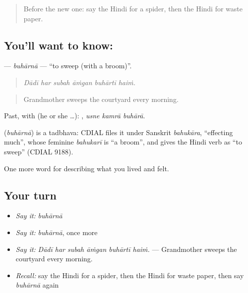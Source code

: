 \label{lesson:HI-C519-buharna}



\begin{quote}
Before the new one: say the Hindi for a spider, then the Hindi for waste paper.
\end{quote}

\subsection*{You'll want to know: }
\textbf{} — \emph{buhārnā} — \textquotedblleft{}to sweep (with a broom)\textquotedblright{}.

\begin{quote}
     
\end{quote}

\begin{quote}
\emph{Dādī har subah āṁgan buhārtī haiṁ.}
\end{quote}

\begin{quote}
Grandmother sweeps the courtyard every morning.
\end{quote}

Past, with  (he or she …):   , \emph{usne kamrā buhārā}.

\begin{cousinweb}
\textbf{} (\emph{buhārnā}) is a tadbhava: CDIAL files it under Sanskrit \emph{bahukāra}, \textquotedblleft{}effecting much\textquotedblright{}, whose feminine \emph{bahukarī} is \textquotedblleft{}a broom\textquotedblright{}, and gives the Hindi verb as \textquotedblleft{}to sweep\textquotedblright{} (CDIAL 9188).
\end{cousinweb}

\begin{grammarlens}[title={What you've built}]
One more word for describing what you lived and felt.
\end{grammarlens}

\subsection*{Your turn}
\begin{itemize}
\raggedright
  \item \emph{Say it:} \emph{buhārnā}
  \item \emph{Say it:} \emph{buhārnā}, once more
  \item \emph{Say it:} \emph{Dādī har subah āṁgan buhārtī haiṁ.} — Grandmother sweeps the courtyard every morning.
  \item \emph{Recall:} say the Hindi for a spider, then the Hindi for waste paper, then say \emph{buhārnā} again
\end{itemize}

